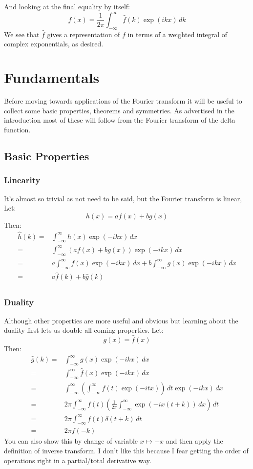 \documentclass[12pt]{report}
\begin{document}
And looking at the final equality by itself:
\[f(x) = \frac{1}{2\pi}\int_{-\infty}^{\infty}\hat{f}(k)\exp(ikx)\,dk\]
We see that $\hat{f}$ gives a representation of $f$ in terms of a weighted integral of complex exponentials, as desired.

\chapter{Fundamentals}
Before moving towards applications of the Fourier transform it will be useful to collect some basic properties, theorems and symmetries.
As advertised in the introduction most of these will follow from the Fourier transform of the delta function.
\section{Basic Properties}
\subsection{Linearity}
It's almost so trivial as not need to be said, but the Fourier transform is linear,
Let:
\[h(x)=af(x)+bg(x)\]
Then:
\begin{equation*}
\begin{aligned}
\hat{h}(k) =& \int_{-\infty}^{\infty}h(x)\exp(-ikx)\,dx \\
=& \int_{-\infty}^{\infty}(af(x)+bg(x))\exp(-ikx)\,dx \\
=& a\int_{-\infty}^{\infty}f(x)\exp(-ikx)\,dx +b\int_{-\infty}^{\infty}g(x)\exp(-ikx)\,dx \\
=& a\hat{f}(k)+b\hat{g}(k) \\
\end{aligned}
\end{equation*}

\subsection{Duality}
Although other properties are more useful and obvious but learning about the duality first lets us double all coming properties.
Let:
\[g(x) = \hat{f}(x)\]
Then:
\begin{equation*}
\begin{aligned}
\hat{g}(k) =&\int_{-\infty}^{\infty}g(x)\exp(-ikx)\,dx \\
=&\int_{-\infty}^{\infty}\hat{f}(x)\exp(-ikx)\,dx \\
=& \int_{-\infty}^{\infty}\left(\int_{-\infty}^{\infty}f(t)\exp(-itx)\right)\,dt\exp(-ikx)\,dx \\
=& 2\pi\int_{-\infty}^{\infty} f(t) \left(\frac{1}{2\pi} \int_{-\infty}^{\infty} \exp(-ix(t+k))\,dx\right)\,dt \\
=& 2\pi\int_{-\infty}^{\infty} f(t) \delta(t+k)\,dt \\
=& 2\pi f(-k)
\end{aligned}
\end{equation*}
You can also show this by change of variable $x\mapsto -x$ and then apply the definition of inverse transform.
I don't like this because I fear getting the order of operations right in a partial/total derivative way.
\end{document}

